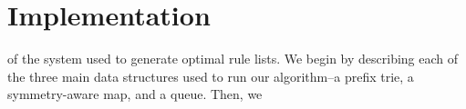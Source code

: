 \chapter{Implementation}





 of the system used to generate optimal rule lists. 
We begin by describing each of the three main data structures used to run our algorithm--a prefix trie, a symmetry-aware map, and a queue. 
Then, we 

